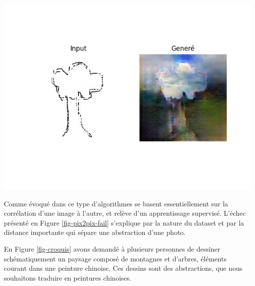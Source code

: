 \documentclass[a4paper, 12pt]{book}
\begin{document}
\begin{center}
\includegraphics[width=0.7\linewidth]{images/pix2pix-fail.png}
\label{fig-pix2pix-fail}
\end{center}

Comme évoqué dans \cite{DBLP:journals/corr/abs-1805-00247} ce type d'algorithmes se basent essentiellement sur la corrélation d'une image à l'autre, et relève d'un apprentissage supervisé. L'échec présenté en Figure \ref{fig-pix2pix-fail} s'explique par la nature du dataset et par la distance importante qui sépare une abstraction d'une photo. 

En Figure \ref{fig-croquis} avons demandé à plusieurs personnes de dessiner schématiquement un paysage composé de montagnes et d'arbres, éléments courant dans une peinture chinoise. Ces dessins sont des abstractions, que nous souhaitons traduire en peintures chinoises.
\end{document}
